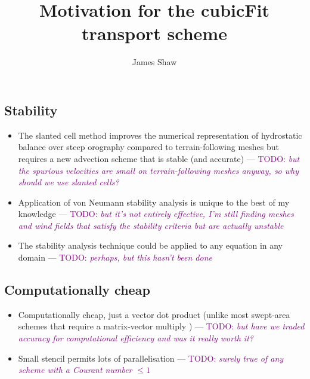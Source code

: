 \documentclass{article}
\title{Motivation for the cubicFit transport scheme}
\author{James Shaw}
\newcommand{\TODO}[1]{\textcolor{purple}{TODO: \emph{#1}}}
\begin{document}
\maketitle

\subsection*{Stability}

\begin{itemize}
	\item The slanted cell method improves the numerical representation of hydrostatic balance over steep orography compared to terrain-following meshes but requires a new advection scheme that is stable (and accurate) --- \TODO{but the spurious velocities are small on terrain-following meshes anyway, so why should we use slanted cells?}
	\item Application of von Neumann stability analysis is unique to the best of my knowledge --- \TODO{but it's not entirely effective, I'm still finding meshes and wind fields that satisfy the stability criteria but are actually unstable}
	\item The stability analysis technique could be applied to any equation in any domain --- \TODO{perhaps, but this hasn't been done}
\end{itemize}

\subsection*{Computationally cheap}

\begin{itemize}
	\item Computationally cheap, just a vector dot product (unlike most swept-area schemes that require a matrix-vector multiply \citep{lashley2002,skamarock-menchaca2010,thuburn2014}) --- \TODO{but have we traded accuracy for computational efficiency and was it really worth it?}
	\item Small stencil permits lots of parallelisation --- \TODO{surely true of any scheme with a Courant number $\leq 1$}
\end{itemize}
\end{document}
